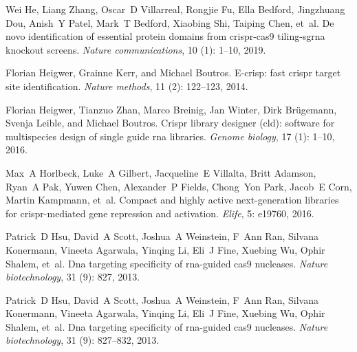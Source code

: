 \documentclass[pdftex,english,10pt]{article}
\begin{document}
{\begin{thebibliography}{105}
Wei He, Liang Zhang, Oscar~D Villarreal, Rongjie Fu, Ella Bedford, Jingzhuang
  Dou, Anish~Y Patel, Mark~T Bedford, Xiaobing Shi, Taiping Chen, et~al.
\newblock De novo identification of essential protein domains from crispr-cas9
  tiling-sgrna knockout screens.
\newblock \emph{Nature communications}, 10 (1): 1--10, 2019.

Florian Heigwer, Grainne Kerr, and Michael Boutros.
\newblock E-crisp: fast crispr target site identification.
\newblock \emph{Nature methods}, 11 (2): 122--123, 2014.

Florian Heigwer, Tianzuo Zhan, Marco Breinig, Jan Winter, Dirk Br{\"u}gemann,
  Svenja Leible, and Michael Boutros.
\newblock Crispr library designer (cld): software for multispecies design of
  single guide rna libraries.
\newblock \emph{Genome biology}, 17 (1): 1--10, 2016.

Max~A Horlbeck, Luke~A Gilbert, Jacqueline~E Villalta, Britt Adamson, Ryan~A
  Pak, Yuwen Chen, Alexander~P Fields, Chong~Yon Park, Jacob~E Corn, Martin
  Kampmann, et~al.
\newblock Compact and highly active next-generation libraries for
  crispr-mediated gene repression and activation.
\newblock \emph{Elife}, 5: e19760, 2016.

Patrick~D Hsu, David~A Scott, Joshua~A Weinstein, F~Ann Ran, Silvana Konermann,
  Vineeta Agarwala, Yinqing Li, Eli~J Fine, Xuebing Wu, Ophir Shalem, et~al.
\newblock Dna targeting specificity of rna-guided cas9 nucleases.
\newblock \emph{Nature biotechnology}, 31 (9): 827,
  2013{}.

Patrick~D Hsu, David~A Scott, Joshua~A Weinstein, F~Ann Ran, Silvana Konermann,
  Vineeta Agarwala, Yinqing Li, Eli~J Fine, Xuebing Wu, Ophir Shalem, et~al.
\newblock Dna targeting specificity of rna-guided cas9 nucleases.
\newblock \emph{Nature biotechnology}, 31 (9): 827--832,
  2013{}.


\end{thebibliography}}
\end{document}
